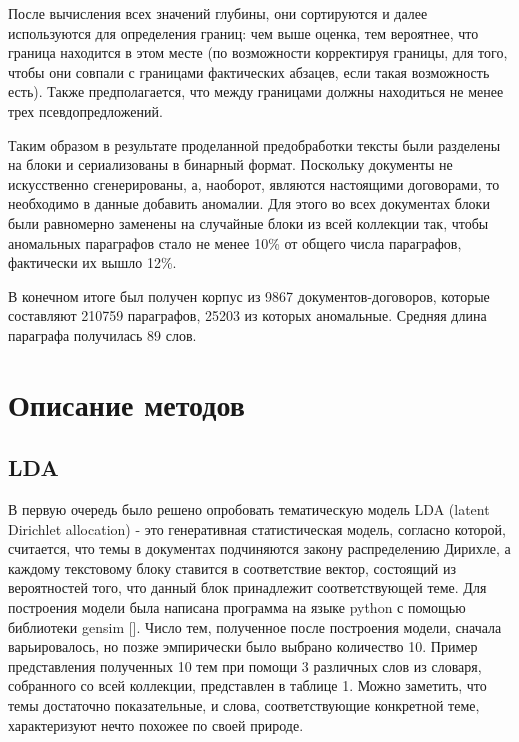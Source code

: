 \documentclass[12pt]{article}
\newcounter{c_tab}
\begin{document}
\begin{enumerate}
{		После вычисления всех значений глубины, они сортируются и далее используются для определения границ: чем выше оценка, тем вероятнее, что граница находится в этом месте (по возможности корректируя границы, для того, чтобы они совпали с границами фактических абзацев, если такая возможность есть). Также предполагается, что между границами должны находиться не менее трех псевдопредложений.
}\end{enumerate}


Таким образом в результате проделанной предобработки тексты были разделены на блоки и сериализованы в бинарный формат. Поскольку документы не искусственно сгенерированы, а, наоборот, являются настоящими договорами, то необходимо в данные добавить аномалии. Для этого во всех документах блоки были равномерно заменены на случайные блоки из всей коллекции так, чтобы аномальных параграфов стало не менее 10\% от общего числа параграфов, фактически их вышло 12\%.

В конечном итоге был получен корпус из 9867 документов-договоров, которые составляют 210759 параграфов, 25203 из которых аномальные. Средняя длина параграфа получилась 89 слов.

\newpage
\section{Описание методов}
\subsection{LDA}
В первую очередь было решено опробовать тематическую модель LDA (latent Dirichlet allocation) - это генеративная статистическая модель, согласно которой, считается, что темы в документах подчиняются закону распределению Дирихле, а каждому текстовому блоку ставится в соответствие вектор, состоящий из вероятностей того, что данный блок принадлежит соответствующей теме. Для построения модели была написана программа на языке python с помощью библиотеки gensim []. Число тем, полученное после построения модели, сначала варьировалось, но позже эмпирически было выбрано количество 10. 
Пример представления полученных 10 тем при помощи 3 различных слов из словаря, собранного со всей коллекции, представлен в таблице 1. Можно заметить, что темы достаточно показательные, и слова, соответствующие конкретной теме, характеризуют нечто похожее по своей природе. 
\end{document}
